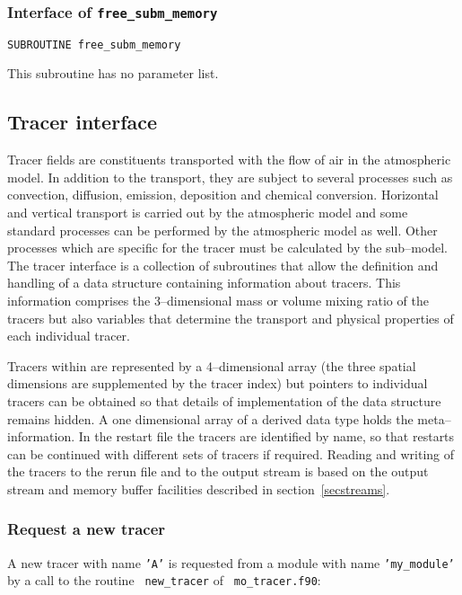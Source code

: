 \subsubsection{Interface of {\tt free\_subm\_memory}}

\begin{lstlisting}[caption=free\_subm\_memory]
  SUBROUTINE free_subm_memory
\end{lstlisting}

This subroutine has no parameter list.

\subsection{Tracer interface}

Tracer fields are constituents transported with the flow of air in the
atmospheric model. In addition to the transport, they are subject to
several processes such as convection, diffusion, emission, deposition
and chemical conversion. Horizontal and vertical transport is carried
out by the atmospheric model and some standard processes can be
performed by the atmospheric model as well. Other processes which are
specific for the tracer must be calculated by the sub--model. The
tracer interface is a collection of subroutines that allow the
definition and handling of a data structure containing information
about tracers. This information comprises the 3--dimensional mass or
volume mixing ratio of the tracers but also variables that determine
the transport and physical properties of each individual tracer.

Tracers within \echam{} are represented by a 4--dimensional array (the
three spatial dimensions are supplemented by the tracer index) but 
pointers to individual
tracers can be obtained so that 
details of implementation of the data structure remains hidden.  A one
dimensional array of a derived data type holds the
meta--information. In the restart file the tracers are identified by
name, so that restarts can be continued with different sets of tracers
if required. Reading and writing of the tracers to the rerun file and
to the output stream is based on the output stream and memory buffer
facilities described in section~\ref{secstreams}.

\subsubsection{Request a new tracer}

A new tracer with name {\tt 'A'} is requested from a module with name
{\tt 'my\_module'} by a call to the routine {\tt
  new\_tracer} of {\tt 
  mo\_tracer.f90}: 
 
